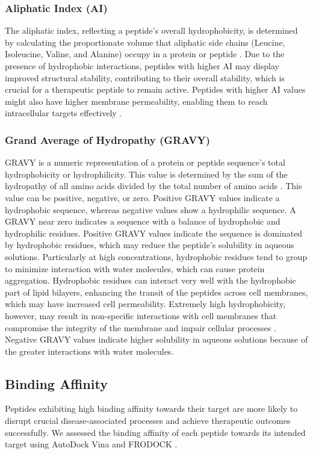 \subsubsection{Aliphatic Index (AI)}
The aliphatic index, reflecting a peptide's overall hydrophobicity, is determined by calculating the proportionate volume that aliphatic side chains (Leucine, Isoleucine, Valine, and Alanine) occupy in a protein or peptide \cite{panda2012physicochemical}. Due to the presence of hydrophobic interactions, peptides with higher AI may display improved structural stability, contributing to their overall stability, which is crucial for a therapeutic peptide to remain active. Peptides with higher AI values might also have higher membrane permeability, enabling them to reach intracellular targets effectively \cite{panda2012physicochemical}.

\subsubsection{Grand Average of Hydropathy (GRAVY)}
GRAVY is a numeric representation of a protein or peptide sequence's total hydrophobicity or hydrophilicity. This value is determined by the sum of the hydropathy of all amino acids divided by the total number of amino acids \cite{kyte1982simple}. This value can be positive, negative, or zero. Positive GRAVY values indicate a hydrophobic sequence, whereas negative values show a hydrophilic sequence. A GRAVY near zero indicates a sequence with a balance of hydrophobic and hydrophilic residues. Positive GRAVY values indicate the sequence is dominated by hydrophobic residues, which may reduce the peptide's solubility in aqueous solutions. Particularly at high concentrations, hydrophobic residues tend to group to minimize interaction with water molecules, which can cause protein aggregation. Hydrophobic residues can interact very well with the hydrophobic part of lipid bilayers, enhancing the transit of the peptides across cell membranes, which may have increased cell permeability. Extremely high hydrophobicity, however, may result in non-specific interactions with cell membranes that compromise the integrity of the membrane and impair cellular processes \cite{kyte1982simple}. Negative GRAVY values indicate higher solubility in aqueous solutions because of the greater interactions with water molecules.

\subsection{Binding Affinity}
Peptides exhibiting high binding affinity towards their target are more likely to disrupt crucial disease-associated processes and achieve therapeutic outcomes successfully. We assessed the binding affinity of each peptide towards its intended target using AutoDock Vina \cite{trott2010autodock} and FRODOCK \cite{Aportela2016}.

